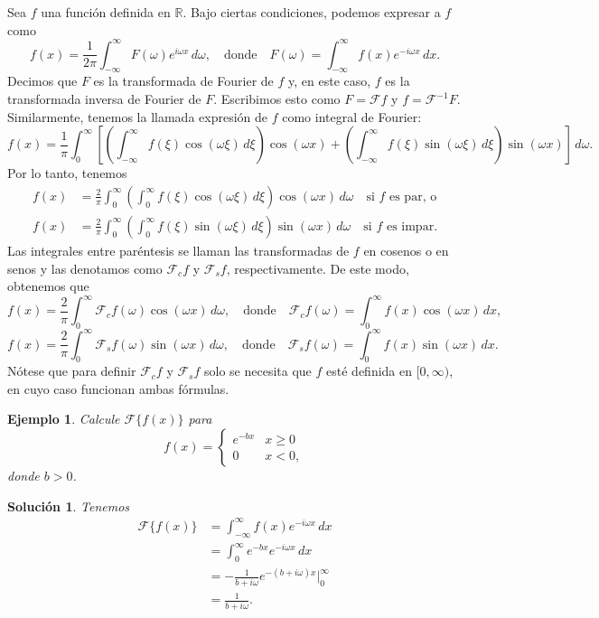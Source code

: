\documentclass[11pt,letterpaper,draft]{report}
\newtheorem{example}[defn]{Ejemplo}
\newtheorem*{sol}{Solución}
\newcommand\R{\mathbb R}
\newcommand\<{\langle}
\renewcommand\>{\rangle}
\let\cal\mathcal
\begin{document}
Sea $f$ una función definida en $\R$.
Bajo ciertas condiciones, podemos expresar a $f$ como
\[
  f(x)
  =
  \frac{1}{2\pi}\int_{-\infty}^{\infty}
  F(\omega)e^{i\omega x}\,d\omega,
  \quad
  \text{donde}
  \quad
  F(\omega)
  = \int_{-\infty}^{\infty}f(x)e^{-i\omega x}\,dx
.\]
Decimos que $F$ es la transformada de Fourier de $f$ y, en este caso,
$f$ es la transformada inversa de Fourier de $F$. Escribimos esto como
$F=\cal Ff$ y $f=\cal F^{-1}F$.
Similarmente, tenemos la llamada expresión de $f$ como integral de
Fourier:
\[
  f(x)=
  \frac{1}{\pi}
  \int_{0}^{\infty}
  \left[
    \left(
    \int_{-\infty}^{\infty}f(\xi)\cos(\omega\xi)\,d\xi
    \right)
    \cos(\omega x)
    +
    \left(
      \int_{-\infty}^{\infty}f(\xi)\sin(\omega\xi)\,d\xi
    \right)
    \sin(\omega x)
  \right]
  \,d\omega
.\]
Por lo tanto, tenemos
\begin{align*}
  f(x)
  &=
  \frac{2}{\pi}
  \int_{0}^{\infty}
    \left(
    \int_{0}^{\infty}f(\xi)\cos(\omega\xi)\,d\xi
    \right)
    \cos(\omega x)
  \,d\omega
  \quad
  \text{si $f$ es par, o} \\
  f(x)
  &=
  \frac{2}{\pi}
  \int_{0}^{\infty}
    \left(
      \int_{0}^{\infty}f(\xi)\sin(\omega\xi)\,d\xi
    \right)
    \sin(\omega x)
  \,d\omega
  \quad
  \text{si $f$ es impar.}
\end{align*}
Las integrales entre paréntesis se llaman las transformadas de $f$ en
cosenos o en senos y las denotamos como $\cal F_cf$ y $\cal F_sf$,
respectivamente. De este modo, obtenemos que
\[
  f(x)
  =
  \frac{2}{\pi}
  \int_{0}^{\infty}\cal F_cf(\omega)\cos(\omega x)\,d\omega,
  \quad
  \text{donde}
  \quad
  \cal F_cf(\omega)
  =
  \int_{0}^{\infty}f(x)\cos(\omega x)\,dx
,\]
\[
  f(x)
  =
  \frac{2}{\pi}
  \int_{0}^{\infty}\cal F_sf(\omega)\sin(\omega x)\,d\omega,
  \quad
  \text{donde}
  \quad
  \cal F_sf(\omega)
  =
  \int_{0}^{\infty}f(x)\sin(\omega x)\,dx
.\]
Nótese que para definir $\cal F_cf$ y $\cal F_sf$ solo se necesita que
$f$ esté definida en $[0,\infty)$, en cuyo caso funcionan ambas
fórmulas.

\begin{example}
  Calcule $\cal F\{f(x)\}$ para
  \[
    f(x)=
    \begin{cases}
      e^{-bx} & x\geq 0 \\
      0 & x<0,
    \end{cases}
  \]
  donde $b>0$.
\end{example}
\begin{sol}
  Tenemos
  \begin{align*}
    \cal F\{f(x)\}
    &= \int_{-\infty}^{\infty}f(x)e^{-i\omega x}\,dx \\
    &= \int_{0}^{\infty}e^{-bx}e^{-i\omega x}\,dx \\
    &= -\frac{1}{b+i\omega}e^{-(b+i\omega)x}\Big|_{0}^{\infty} \\
    &= \frac{1}{b+i\omega}.
  \end{align*}
\end{sol}
\end{document}

